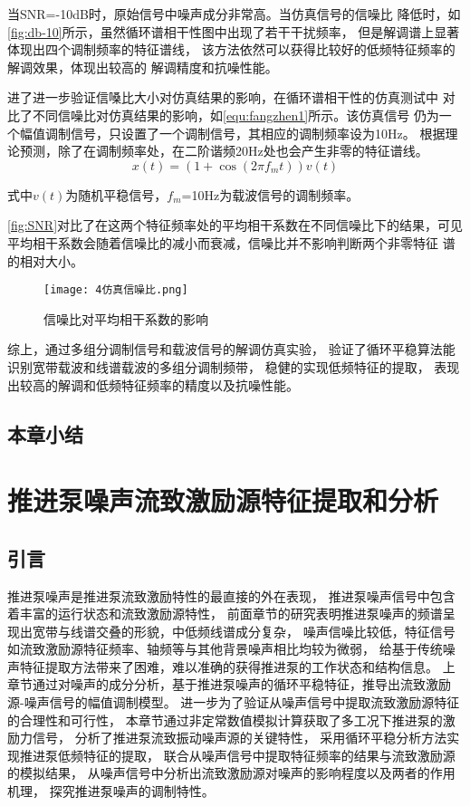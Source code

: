 当SNR=-10dB时，原始信号中噪声成分非常高。当仿真信号的信噪比
降低时，如\autoref{fig:db-10}所示，虽然循环谱相干性图中出现了若干干扰频率，
但是解调谱上显著体现出四个调制频率的特征谱线，
该方法依然可以获得比较好的低频特征频率的解调效果，体现出较高的
解调精度和抗噪性能。

进了进一步验证信嗓比大小对仿真结果的影响，在循环谱相干性的仿真测试中
对比了不同信噪比对仿真结果的影响，如\autoref{equ:fangzhen1}所示。该仿真信号
仍为一个幅值调制信号，只设置了一个调制信号，其相应的调制频率设为10Hz。
根据理论预测，除了在调制频率处，在二阶谐频20Hz处也会产生非零的特征谱线。
\begin{equation}
    \label{equ:fangzhen1}
    x\left ( t \right ) =\left ( 1+\cos \left ( 2\pi f_mt \right )  \right ) v\left ( t \right ) 
\end{equation}

式中$v\left ( t \right )$为随机平稳信号，$f_m$=10Hz为载波信号的调制频率。

\autoref{fig:SNR}对比了在这两个特征频率处的平均相干系数在不同信噪比下的结果，可见
平均相干系数会随着信噪比的减小而衰减，信噪比并不影响判断两个非零特征
谱的相对大小。

\begin{figure}[htbp]
    \centering
    \texttt{[image: 4仿真信噪比.png]}
    \caption{\label{fig:SNR}信噪比对平均相干系数的影响
    }
\end{figure}

综上，通过多组分调制信号和载波信号的解调仿真实验，
验证了循环平稳算法能识别宽带载波和线谱载波的多组分调制频带，
稳健的实现低频特征的提取，
表现出较高的解调和低频特征频率的精度以及抗噪性能。
\section{本章小结}


\chapter{推进泵噪声流致激励源特征提取和分析}
\section{引言}
推进泵噪声是推进泵流致激励特性的最直接的外在表现，
推进泵噪声信号中包含着丰富的运行状态和流致激励源特性，
前面章节的研究表明推进泵噪声的频谱呈现出宽带与线谱交叠的形貌，中低频线谱成分复杂，
噪声信噪比较低，特征信号如流致激励源特征频率、轴频等与其他背景噪声相比均较为微弱，
给基于传统噪声特征提取方法带来了困难，难以准确的获得推进泵的工作状态和结构信息。
上章节通过对噪声的成分分析，基于推进泵噪声的循环平稳特征，推导出流致激励源-噪声信号的幅值调制模型。
进一步为了验证从噪声信号中提取流致激励源特征的合理性和可行性，
本章节通过非定常数值模拟计算获取了多工况下推进泵的激励力信号，
分析了推进泵流致振动噪声源的关键特性，
采用循环平稳分析方法实现推进泵低频特征的提取，
联合从噪声信号中提取特征频率的结果与流致激励源的模拟结果，
从噪声信号中分析出流致激励源对噪声的影响程度以及两者的作用机理，
探究推进泵噪声的调制特性。
